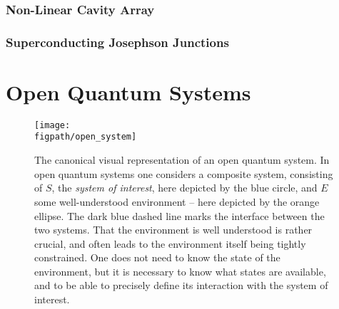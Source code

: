 \subsubsection{Non-Linear Cavity Array}


\subsubsection{Superconducting Josephson Junctions}

\section{Open Quantum Systems}

\begin{figure}[ht!]
\centering
\texttt{[image: \\figpath/open\_system]}
\caption{The canonical visual representation of an open quantum system. In open quantum systems one considers a composite system, consisting of \(S\), the \emph{system of interest}, here depicted by the blue circle, and \(E\) some well-understood environment -- here depicted by the orange ellipse. The dark blue dashed line marks the interface between the two systems. That the environment is well understood is rather crucial, and often leads to the environment itself being tightly constrained. One does not need to know the state of the environment, but it is necessary to know what states are available, and to be able to precisely define its interaction with the system of interest.}
\label{fig:oqs1-1}
\end{figure}